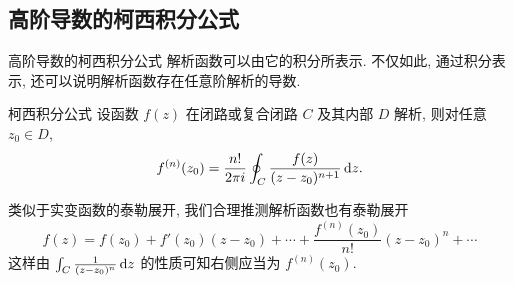 

\subsection{高阶导数的柯西积分公式}
\begin{frame}{高阶导数的柯西积分公式}
\onslide<+->
解析函数可以由它的积分所表示.
\onslide<+->
不仅如此, 通过积分表示, 还可以说明\alert{解析函数存在任意阶解析的导数}.

\onslide<+->
\begin{block}{柯西积分公式}
设函数 $f(z)$ 在闭路或复合闭路 $C$ 及其内部 $D$ 解析, 则对任意 $z_0\in D$,
\[f^{(n)}(z_0)=\frac{n!}{2\pi i}\oint_C\frac{f(z)}{(z-z_0)^{n+1}}\,\mathrm{d} z.\]
\end{block}
\onslide<+->
类似于实变函数的泰勒展开, 我们合理推测解析函数也有泰勒展开
\[f(z)=f(z_0)+f'(z_0)(z-z_0)+\cdots+\frac{f^{(n)}(z_0)}{n!}(z-z_0)^n+\cdots\]
\onslide<+->
这样由 $\int_C \frac1{(z-z_0)^n}\,\mathrm{d} z$ 的性质可知右侧应当为 $f^{(n)}(z_0)$.
\end{frame}


